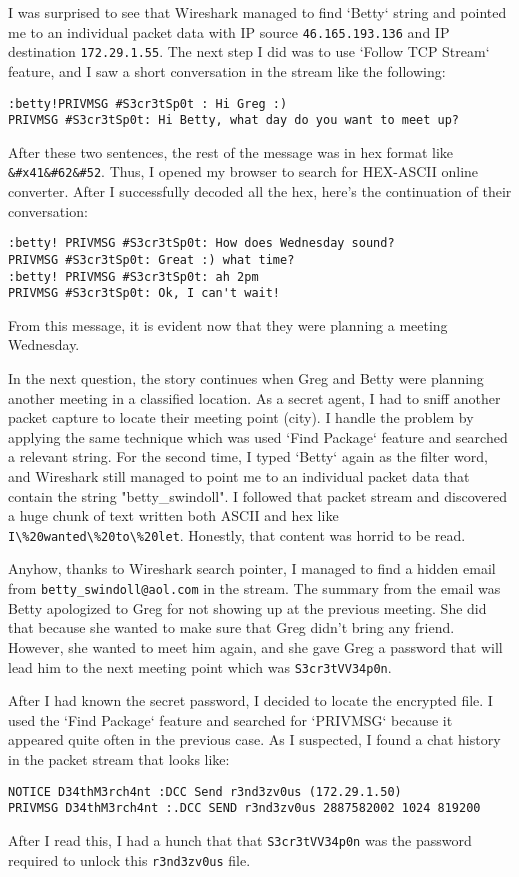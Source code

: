 \documentclass[letterpaper,10pt,titlepage,draftclsnofoot,onecolumn]{IEEEtran}
\begin{document}
I was surprised to see that Wireshark managed to find `Betty` string and pointed me to an individual packet data with IP source \verb|46.165.193.136| and IP destination \verb|172.29.1.55|. 
The next step I did was to use `Follow TCP Stream` feature, and I saw a short conversation in the stream like the following:
\begin{lstlisting}
:betty!PRIVMSG #S3cr3tSp0t : Hi Greg :)
PRIVMSG #S3cr3tSp0t: Hi Betty, what day do you want to meet up?
\end{lstlisting}
After these two sentences, the rest of the message was in hex format like \verb|&#x41&#62&#52|. 
Thus, I opened my browser to search for HEX-ASCII online converter.
After I successfully decoded all the hex, here's the continuation of their conversation:
\begin{lstlisting}
:betty! PRIVMSG #S3cr3tSp0t: How does Wednesday sound?
PRIVMSG #S3cr3tSp0t: Great :) what time?
:betty! PRIVMSG #S3cr3tSp0t: ah 2pm
PRIVMSG #S3cr3tSp0t: Ok, I can't wait!
\end{lstlisting}
From this message, it is evident now that they were planning a meeting Wednesday.

In the next question, the story continues when Greg and Betty were planning another meeting in a classified location. 
As a secret agent, I had to sniff another packet capture to locate their meeting point (city).
I handle the problem by applying the same technique which was used `Find Package` feature and searched a relevant string. 
For the second time, I typed `Betty` again as the filter word, and Wireshark still managed to point me to an individual packet data that contain the string "betty\_swindoll".
I followed that packet stream and discovered a huge chunk of text written both ASCII and hex like \verb|I\%20wanted\%20to\%20let|. 
Honestly, that content was horrid to be read.

Anyhow, thanks to Wireshark search pointer, I managed to find a  hidden email from \verb|betty_swindoll@aol.com| in the stream.
The summary from the email was Betty apologized to Greg for not showing up at the previous meeting. 
She did that because she wanted to make sure that Greg didn't bring any friend.
However, she wanted to meet him again, and she gave Greg a password that will lead him to the next meeting point which was \verb|S3cr3tVV34p0n|.

After I had known the secret password, I decided to locate the encrypted file. 
I used the `Find Package` feature and searched for `PRIVMSG` because it appeared quite often in the previous case. 
As I suspected, I found a chat history in the packet stream that looks like:
\begin{lstlisting}
NOTICE D34thM3rch4nt :DCC Send r3nd3zv0us (172.29.1.50)
PRIVMSG D34thM3rch4nt :.DCC SEND r3nd3zv0us 2887582002 1024 819200
\end{lstlisting}
After I read this, I had a hunch that that \verb|S3cr3tVV34p0n| was the password required to unlock this \verb|r3nd3zv0us| file.
\end{document}
